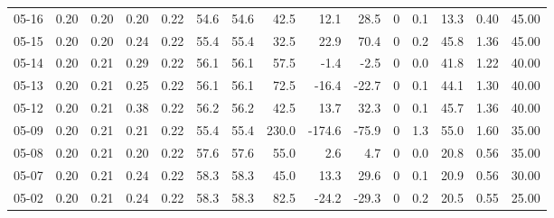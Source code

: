 \begin{threeparttable}
{\begin{tabular}{lrrrrrrrrrrrrrr}
  05-16 &          0.20 &          0.20 &          0.20 &        0.22 &                54.6 &               54.6 &                42.5 &       12.1 &         28.5 &              0 &                 0.1 &             13.3 &            0.40 &                  45.00 \\
  05-15 &          0.20 &          0.20 &          0.24 &        0.22 &                55.4 &               55.4 &                32.5 &       22.9 &         70.4 &              0 &                 0.2 &             45.8 &            1.36 &                  45.00 \\
  05-14 &          0.20 &          0.21 &          0.29 &        0.22 &                56.1 &               56.1 &                57.5 &       -1.4 &         -2.5 &              0 &                 0.0 &             41.8 &            1.22 &                  40.00 \\
  05-13 &          0.20 &          0.21 &          0.25 &        0.22 &                56.1 &               56.1 &                72.5 &      -16.4 &        -22.7 &              0 &                 0.1 &             44.1 &            1.30 &                  40.00 \\
  05-12 &          0.20 &          0.21 &          0.38 &        0.22 &                56.2 &               56.2 &                42.5 &       13.7 &         32.3 &              0 &                 0.1 &             45.7 &            1.36 &                  40.00 \\
  05-09 &          0.20 &          0.21 &          0.21 &        0.22 &                55.4 &               55.4 &               230.0 &     -174.6 &        -75.9 &              0 &                 1.3 &             55.0 &            1.60 &                  35.00 \\
  05-08 &          0.20 &          0.21 &          0.20 &        0.22 &                57.6 &               57.6 &                55.0 &        2.6 &          4.7 &              0 &                 0.0 &             20.8 &            0.56 &                  35.00 \\
  05-07 &          0.20 &          0.21 &          0.24 &        0.22 &                58.3 &               58.3 &                45.0 &       13.3 &         29.6 &              0 &                 0.1 &             20.9 &            0.56 &                  30.00 \\
  05-02 &          0.20 &          0.21 &          0.24 &        0.22 &                58.3 &               58.3 &                82.5 &      -24.2 &        -29.3 &              0 &                 0.2 &             20.5 &            0.55 &                  25.00 \\

\end{tabular}}
\end{threeparttable}
